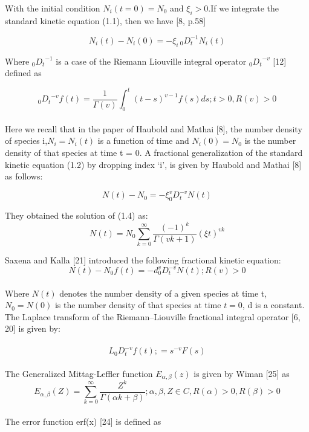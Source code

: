 \documentclass[leqno]{article}
\begin{document}
With the initial condition $N_i (t=0) = N_0$ and $\xi _i > 0$.If we integrate the standard kinetic equation (1.1), then we have [8, p.58]

\begin{equation}
N_i (t) - N_i (0) = -\xi _{i}\,{_0 D_t^{-1}}N_i (t)
\end{equation}


Where ${_0 D_t}^{-1}$ is a case of the Riemann \- Liouville integral operator ${_0 D_t}^{-v}$ [12] defined as

\begin{equation}
    {_0 D_t}^{-v} f (t) = \frac{1}{\Gamma{(v)}}
    \int_0^t(t - s)^{v-1}
    f(s)ds;
    t > 0,
    R(v) > 0 
\end{equation}

\paragraph{}
Here we recall that in the paper of Haubold and Mathai [8], the number density of species i,$N_i = N_i (t)$ is a function of time and $N_i (0) = N_0$ is the number density of that species at time t = 0.
A fractional generalization of the standard kinetic equation (1.2) by dropping index ‘i’, is given by Haubold and Mathai [8] as follows:

\begin{equation}
    N(t) - N_0
    =-\xi ^v_0
    D^{-v}_t
    N (t)
\end{equation}

They obtained the solution of (1.4) as:
\begin{equation}
    N(t) 
    =N_0
    \sum_{k=0}^\infty 
    \frac{(-1)^k}{\Gamma{(vk+1)}}(\xi t)^{vk}
\end{equation}

Saxena and Kalla [21] introduced the following fractional kinetic equation:
\begin{equation}
    N(t) - N_0f(t)
    =-d ^v_0
    D^{-v}_t
    N (t)
    ;R(v) > 0
\end{equation}
\paragraph{}
Where $N(t)$ denotes the number density of a given species at time t,$N_0 = N(0)$ is the number density of that species at time $t = 0$, d is a constant.
The Laplace transform of the Riemann–Liouville fractional integral operator [6, 20] is given by:
\\
\\
\begin{equation}
L_0D_t^{-v}f(t);=s^{-v}F(s)
\end{equation}
\\
The Generalized Mittag-Leffler function $E_{\alpha , \beta}(z)$ is given by Wiman [25] as
\\ 
\begin{equation}
    E_{\alpha , \beta}(Z) 
    = \sum_{k = 0}^{\infty}
    \frac{Z^k}{\Gamma{(\alpha k + \beta)}};
    \alpha ,
    \beta ,
    Z \in C,
    R(\alpha) > 0,
    R(\beta) > 0
\end{equation}
\\ 
The error function erf(x) [24] is defined as 
\end{document}
